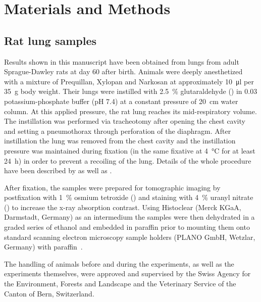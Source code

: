 \documentclass[%
	paper=a4,%
	abstract=true,%
	]{scrartcl}
\begin{document}
\section{Materials and Methods\label{sec:MM}}
\subsection{Rat lung samples}
Results shown in this manuscript have been obtained from lungs from adult Sprague-Dawley rats at day 60 after birth. Animals were deeply anesthetized with a mixture of Prequillan, Xylopan and Narkosan at approximately \SI{10}{\micro\litre} per \SI{35}{\gram} body weight. Their lungs were instilled with \SI{2.5}{\percent} glutaraldehyde () in \SI{0.03}{\Molar} potassium-phosphate buffer (pH 7.4) at a constant pressure of \SI{20}{\centi\meter} water column. At this applied pressure, the rat lung reaches its mid-respiratory volume. The instillation was performed via tracheotomy after opening the chest cavity and setting a pneumothorax through perforation of the diaphragm. After instillation the lung was removed from the chest cavity and the instillation pressure was maintained during fixation (in the same fixative at \SI{4}{\celsius} for at least \SI{24}{\hour}) in order to prevent a recoiling of the lung. Details of the whole procedure have been described by \citet{Tschanz2002} as well as \citet{Burri1974}.

After fixation, the samples were prepared for tomographic imaging by postfixation with \SI{1}{\percent} osmium tetroxide () and staining with \SI{4}{\percent} uranyl nitrate () to increase the x-ray absorption contrast. Using Histoclear (Merck KGaA, Darmstadt, Germany) as an intermedium the samples were then dehydrated in a graded series of ethanol and embedded in paraffin prior to mounting them onto standard scanning electron microscopy sample holders (PLANO GmbH, Wetzlar, Germany) with paraffin~\cite{Tsuda2008}.

The handling of animals before and during the experiments, as well as the experiments themselves, were approved and supervised by the Swiss Agency for the Environment, Forests and Landscape and the Veterinary Service of the Canton of Bern, Switzerland.
\end{document}
